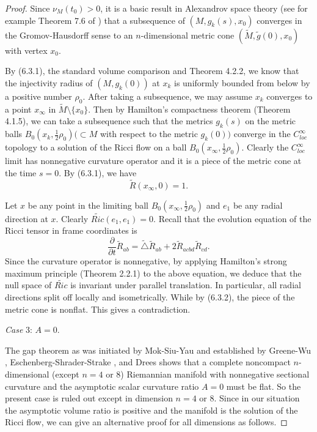 \begin{proof}
Since $\nu_M(t_0) >0$, it is a basic result in Alexandrov space
theory (see for example Theorem 7.6 of \cite{CC96}) that a
subsequence of $(M,g_k(s),x_0)$ converges in the Gromov-Hausdorff
sense to an $n$-dimensional metric cone
$(\tilde{M},\tilde{g}(0),x_0)$ with vertex $x_0$.

By (6.3.1), the standard volume comparison and Theorem 4.2.2, we
know that the injectivity radius of $(M,g_k(0))$ at $x_k$ is
uniformly bounded from below by a positive number $\rho_0$. After
taking a subsequence, we may assume $x_k$ converges to a point
$x_{\infty}$ in $\tilde{M}\setminus \{x_0\}$. Then by Hamilton's
compactness theorem (Theorem 4.1.5), we can take a subsequence
such that the metrics $g_k(s)$ on the metric balls
$B_0(x_k,\frac{1}{2}\rho_0) (\subset M $ with respect to the
metric $g_k(0))$ converge in the $C^{\infty}_{loc}$ topology to a
solution of the Ricci flow on a ball
$B_0(x_{\infty},\frac{1}{2}\rho_0)$. Clearly the
$C^{\infty}_{loc}$ limit has nonnegative curvature operator and it
is a piece of the metric cone at the time $s=0$. By (6.3.1), we
have \begin{equation}
\tilde{R}(x_{\infty},0) = 1. %
\end{equation}

Let $x$ be any point in the limiting ball
$B_0(x_{\infty},\frac{1}{2}\rho_0)$ and $e_1$ be any radial
direction at $x$. Clearly $\tilde{Ric}(e_1,e_1) = 0$. Recall that
the evolution equation of the Ricci tensor in frame coordinates is
$$
\frac{\partial}{\partial t}{\tilde{R}_{ab}} =
\tilde{\triangle}{\tilde{R}_{ab}} +
2{\tilde{R}_{acbd}}{\tilde{R}_{cd}}.
$$
Since the curvature operator is nonnegative, by applying
Hamilton's strong maximum principle (Theorem 2.2.1) to the above
equation, we deduce that the null space of $\tilde{Ric}$ is
invariant under parallel translation. In particular, all radial
directions split off locally and isometrically. While by (6.3.2),
the piece of the metric cone is nonflat. This gives a
contradiction.

\medskip
{\it Case} 3: $A = 0$.

\smallskip
The gap theorem as was initiated by Mok-Siu-Yau \cite{MoSY} and
established by Greene-Wu \cite{GW82, GW},
Eschenberg-Shrader-Strake \cite{ESS}, and Drees \cite{Dr} shows
that a complete noncompact $n$-dimensional (except $n=4$ or $8$)
Riemannian manifold with nonnegative sectional curvature and the
asymptotic scalar curvature ratio $A=0$ must be flat. So the
present case is ruled out except in dimension $n=4$ or $8$. Since
in our situation the asymptotic volume ratio is positive and the
manifold is the solution of the Ricci flow, we can give an
alternative proof for all dimensions as follows.


\end{proof}
